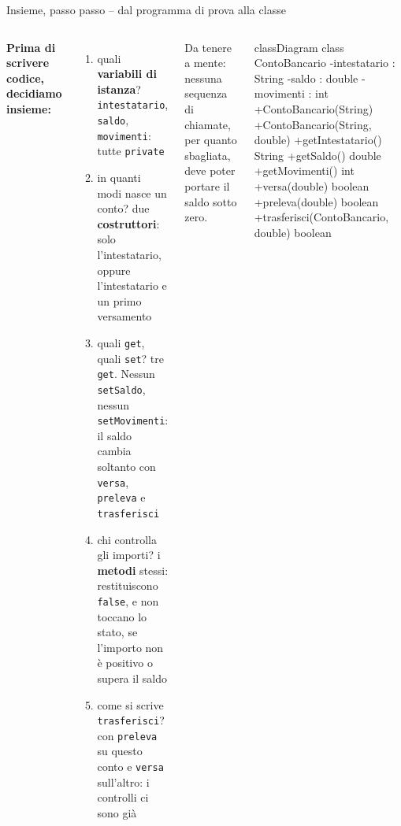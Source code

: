\documentclass[10pt,aspectratio=169]{beamer}
\begin{document}
\begin{frame}[fragile]{Insieme, passo passo -- dal programma di prova alla classe}
\begin{columns}[T]
\small
\textbf{Prima di scrivere codice, decidiamo insieme:}
\begin{enumerate}\itemsep=4pt
    \item quali \textbf{variabili di istanza}? \textrightarrow{} \texttt{intestatario}, \texttt{saldo}, \texttt{movimenti}: tutte \texttt{private}
    \item in quanti modi nasce un conto? \textrightarrow{} due \textbf{costruttori}: solo l'intestatario, oppure l'intestatario e un primo versamento
    \item quali \texttt{get}, quali \texttt{set}? \textrightarrow{} tre \texttt{get}. Nessun \texttt{setSaldo}, nessun \texttt{setMovimenti}: il saldo cambia soltanto con \texttt{versa}, \texttt{preleva} e \texttt{trasferisci}
    \item chi controlla gli importi? \textrightarrow{} i \textbf{metodi} stessi: restituiscono \texttt{false}, e non toccano lo stato, se l'importo non è positivo o supera il saldo
    \item come si scrive \texttt{trasferisci}? \textrightarrow{} con \texttt{preleva} su questo conto e \texttt{versa} sull'altro: i controlli ci sono già
\end{enumerate}

\vspace{0.1cm}
Da tenere a mente: nessuna sequenza di chiamate, per quanto sbagliata, deve poter portare il saldo sotto zero.

\begin{mermaid}
classDiagram
  class ContoBancario {
    -intestatario : String
    -saldo : double
    -movimenti : int
    +ContoBancario(String)
    +ContoBancario(String, double)
    +getIntestatario() String
    +getSaldo() double
    +getMovimenti() int
    +versa(double) boolean
    +preleva(double) boolean
    +trasferisci(ContoBancario, double) boolean
  }
\end{mermaid}
\end{columns}
\end{frame}
\end{document}

